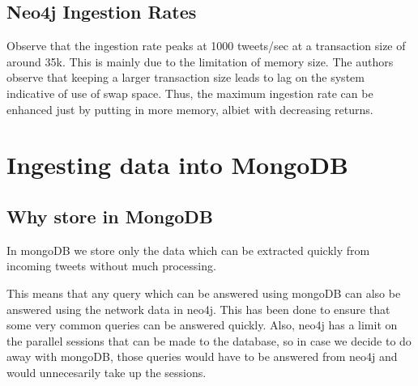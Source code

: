 \documentclass[letterpaper,10pt,english]{sphinxmanual}
\begin{document}
\section{Neo4j Ingestion Rates}
\label{\detokenize{neo4j_data_ingestion:neo4j-ingestion-rates}}
\noindent{}

Observe that the ingestion rate peaks at 1000 tweets/sec at a transaction size of around 35k. This is mainly due to the limitation of memory size. The authors observe that keeping a larger transaction size leads to lag on the system indicative of use of swap space. Thus, the maximum ingestion rate can be enhanced just by putting in more memory, albiet with decreasing returns.


\chapter{Ingesting data into MongoDB}
\label{\detokenize{mongoDB_data_ingestion:ingesting-data-into-mongodb}}\label{\detokenize{mongoDB_data_ingestion::doc}}

\section{Why store in MongoDB}
\label{\detokenize{mongoDB_data_ingestion:why-store-in-mongodb}}
In mongoDB we store only the data which can be extracted quickly from incoming tweets without much processing.

This means that any query which can be answered using mongoDB can also be answered using the network data in neo4j. This has been done to ensure that some very common queries can be answered quickly. Also, neo4j has a limit on the parallel sessions that can be made to the database, so in case we decide to do away with mongoDB, those queries would have to be answered from neo4j and would unnecesarily take up the sessions.
\end{document}
